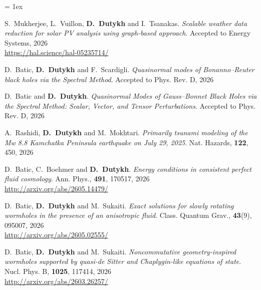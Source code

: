 \documentclass[final, a4paper, oneside, 12pt]{article}
\numberwithin{equation}{section}
\begin{document}
\listpartsep = 1ex

\begin{etaremune}



  \item S.~Mukherjee, L.~Vuillon, \textbf{D.~Dutykh} and I.~Tsanakas. \textit{Scalable weather data reduction for solar PV analysis using graph-based approach}. Accepted to Energy Systems, 2026 \\ %
  \url{https://hal.science/hal-05235714/}

  \item D.~Batic, \textbf{D.~Dutykh} and F.~Scardigli. \textit{Quasinormal modes of Bonanno--Reuter black holes via the Spectral Method}. Accepted to Phys. Rev. D, 2026 %

  \item D.~Batic and \textbf{D.~Dutykh}. \textit{Quasinormal Modes of Gauss--Bonnet Black Holes via the Spectral Method: Scalar, Vector, and Tensor Perturbations}. Accepted to Phys. Rev. D, 2026 %

  \item A.~Rashidi, \textbf{D.~Dutykh} and M.~Mokhtari. \textit{Primarily tsunami modeling of the Mw 8.8 Kamchatka Peninsula earthquake on July 29, 2025}. Nat. Hazards, \textbf{122}, 450, 2026 %
  
  \item D.~Batic, C.~Boehmer and \textbf{D.~Dutykh}. \textit{Energy conditions in consistent perfect fluid cosmology}. Ann. Phys., \textbf{491}, 170517, 2026 \\ %
  \url{http://arxiv.org/abs/2605.14479/}
  
  \item D.~Batic, \textbf{D.~Dutykh} and M.~Sukaiti. \textit{Exact solutions for slowly rotating wormholes in the presence of an anisotropic fluid}. Class. Quantum Grav., \textbf{43}(9), 095007, 2026 \\ %
  \url{http://arxiv.org/abs/2605.02555/}

  \item D.~Batic, \textbf{D.~Dutykh} and M.~Sukaiti. \textit{Noncommutative geometry-inspired wormholes supported by quasi-de Sitter and Chaplygin-like equations of state}. Nucl. Phys. B, \textbf{1025}, 117414, 2026 \\ %
  \url{http://arxiv.org/abs/2603.26257/}


\end{etaremune}
\end{document}
